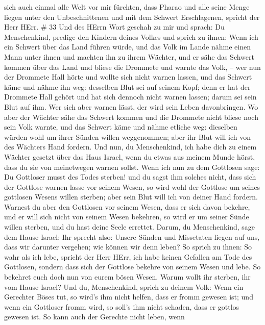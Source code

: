 sich auch einmal alle Welt vor mir fürchten, dass Pharao und alle seine
Menge liegen unter den Unbeschnittenen und mit dem Schwert Erschlagenen,
spricht der Herr HErr. \# 33  Und des HErrn Wort geschah zu
mir und sprach:  Du Menschenkind, predige den Kindern deines
Volkes und sprich zu ihnen: Wenn ich ein Schwert über das Land führen
würde, und das Volk im Lande nähme einen Mann unter ihnen und machten
ihn zu ihrem Wächter,  und er sähe das Schwert kommen über
das Land und bliese die Drommete und warnte das Volk, -- 
wer nun der Drommete Hall hörte und wollte sich nicht warnen lassen, und
das Schwert käme und nähme ihn weg: desselben Blut sei auf seinem Kopf;
 denn er hat der Drommete Hall gehört und hat sich dennoch
nicht warnen lassen; darum sei sein Blut auf ihm. Wer sich aber warnen
lässt, der wird sein Leben davonbringen.  Wo aber der
Wächter sähe das Schwert kommen und die Drommete nicht bliese noch sein
Volk warnte, und das Schwert käme und nähme etliche weg: dieselben
würden wohl um ihrer Sünden willen weggenommen; aber ihr Blut will ich
von des Wächters Hand fordern.  Und nun, du Menschenkind,
ich habe dich zu einem Wächter gesetzt über das Haus Israel, wenn du
etwas aus meinem Munde hörst, dass du sie von meinetwegen warnen sollst.
 Wenn ich nun zu dem Gottlosen sage: Du Gottloser musst des
Todes sterben! und du sagst ihm solches nicht, dass sich der Gottlose
warnen lasse vor seinem Wesen, so wird wohl der Gottlose um seines
gottlosen Wesens willen sterben; aber sein Blut will ich von deiner Hand
fordern.  Warnest du aber den Gottlosen vor seinem Wesen,
dass er sich davon bekehre, und er will sich nicht von seinem Wesen
bekehren, so wird er um seiner Sünde willen sterben, und du hast deine
Seele errettet.  Darum, du Menschenkind, sage dem Hause
Israel: Ihr sprecht also: Unsere Sünden und Missetaten liegen auf uns,
dass wir darunter vergehen; wie können wir denn leben?  So
sprich zu ihnen: So wahr als ich lebe, spricht der Herr HErr, ich habe
keinen Gefallen am Tode des Gottlosen, sondern dass sich der Gottlose
bekehre von seinem Wesen und lebe. So bekehret euch doch nun von eurem
bösen Wesen. Warum wollt ihr sterben, ihr vom Hause Israel?
 Und du, Menschenkind, sprich zu deinem Volk: Wenn ein
Gerechter Böses tut, so wird's ihm nicht helfen, dass er fromm gewesen
ist; und wenn ein Gottloser fromm wird, so soll's ihm nicht schaden,
dass er gottlos gewesen ist. So kann auch der Gerechte nicht leben, wenn
